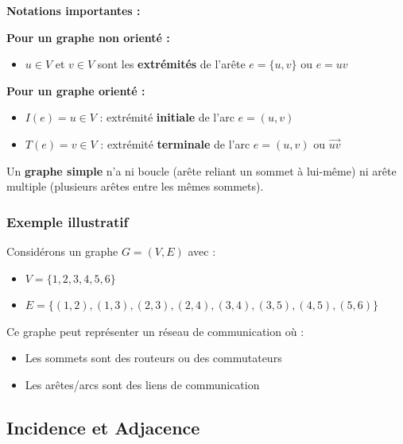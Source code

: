 \documentclass[12pt,a4paper]{article}
\begin{document}
\begin{notecours}
\textbf{Notations importantes :}

\textbf{Pour un graphe non orienté :}
\begin{itemize}
    \item $u \in V$ et $v \in V$ sont les \textbf{extrémités} de l'arête $e = \{u, v\}$ ou $e = uv$
\end{itemize}

\textbf{Pour un graphe orienté :}
\begin{itemize}
    \item $I(e) = u \in V$ : extrémité \textbf{initiale} de l'arc $e = (u, v)$
    \item $T(e) = v \in V$ : extrémité \textbf{terminale} de l'arc $e = (u, v)$ ou $\overrightarrow{uv}$
\end{itemize}
\end{notecours}

\begin{astuce}
Un \textbf{graphe simple} n'a ni boucle (arête reliant un sommet à lui-même) ni arête multiple (plusieurs arêtes entre les mêmes sommets).
\end{astuce}

\subsubsection{Exemple illustratif}

\begin{exemple}
Considérons un graphe $G = (V, E)$ avec :
\begin{itemize}
    \item $V = \{1, 2, 3, 4, 5, 6\}$
    \item $E = \{(1,2), (1,3), (2,3), (2,4), (3,4), (3,5), (4,5), (5,6)\}$
\end{itemize}

Ce graphe peut représenter un réseau de communication où :
\begin{itemize}
    \item Les sommets sont des routeurs ou des commutateurs
    \item Les arêtes/arcs sont des liens de communication
\end{itemize}
\end{exemple}

\newpage
\subsection{Incidence et Adjacence}
\end{document}
